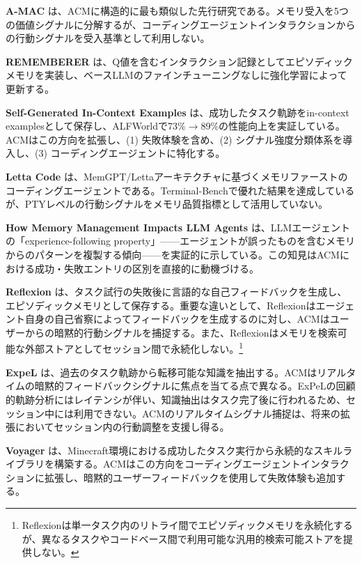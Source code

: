 \documentclass[conference]{IEEEtran}
\begin{document}
\textbf{A-MAC} \cite{Zhang2026AMAC}は、ACMに構造的に最も類似した先行研究である。メモリ受入を5つの価値シグナルに分解するが、コーディングエージェントインタラクションからの行動シグナルを受入基準として利用しない。

\textbf{REMEMBERER} \cite{Zhang2023REMEMBERER}は、Q値を含むインタラクション記録としてエピソディックメモリを実装し、ベースLLMのファインチューニングなしに強化学習によって更新する。

\textbf{Self-Generated In-Context Examples} \cite{Sarukkai2025SelfGenICE}は、成功したタスク軌跡をin-context examplesとして保存し、ALFWorldで73\%$\rightarrow$89\%の性能向上を実証している。ACMはこの方向を拡張し、(1) 失敗体験を含め、(2) シグナル強度分類体系を導入し、(3) コーディングエージェントに特化する。

\textbf{Letta Code} \cite{LettaCode2025}は、MemGPT/Lettaアーキテクチャに基づくメモリファーストのコーディングエージェントである。Terminal-Benchで優れた結果を達成しているが、PTYレベルの行動シグナルをメモリ品質指標として活用していない。

\textbf{How Memory Management Impacts LLM Agents} \cite{Xiong2025MemoryMgmt}は、LLMエージェントの「experience-following property」——エージェントが誤ったものを含むメモリからのパターンを複製する傾向——を実証的に示している。この知見はACMにおける成功・失敗エントリの区別を直接的に動機づける。

\textbf{Reflexion} \cite{Shinn2023Reflexion}は、タスク試行の失敗後に言語的な自己フィードバックを生成し、エピソディックメモリとして保存する。重要な違いとして、Reflexionはエージェント自身の自己省察によってフィードバックを生成するのに対し、ACMはユーザーからの暗黙的行動シグナルを捕捉する。また、Reflexionはメモリを検索可能な外部ストアとしてセッション間で永続化しない。\footnote{Reflexionは単一タスク内のリトライ間でエピソディックメモリを永続化するが、異なるタスクやコードベース間で利用可能な汎用的検索可能ストアを提供しない。}

\textbf{ExpeL} \cite{Zhao2023ExpeL}は、過去のタスク軌跡から転移可能な知識を抽出する。ACMはリアルタイムの暗黙的フィードバックシグナルに焦点を当てる点で異なる。ExPeLの回顧的軌跡分析にはレイテンシが伴い、知識抽出はタスク完了後に行われるため、セッション中には利用できない。ACMのリアルタイムシグナル捕捉は、将来の拡張においてセッション内の行動調整を支援し得る。

\textbf{Voyager} \cite{Wang2023Voyager}は、Minecraft環境における成功したタスク実行から永続的なスキルライブラリを構築する。ACMはこの方向をコーディングエージェントインタラクションに拡張し、暗黙的ユーザーフィードバックを使用して失敗体験も追加する。
\end{document}
